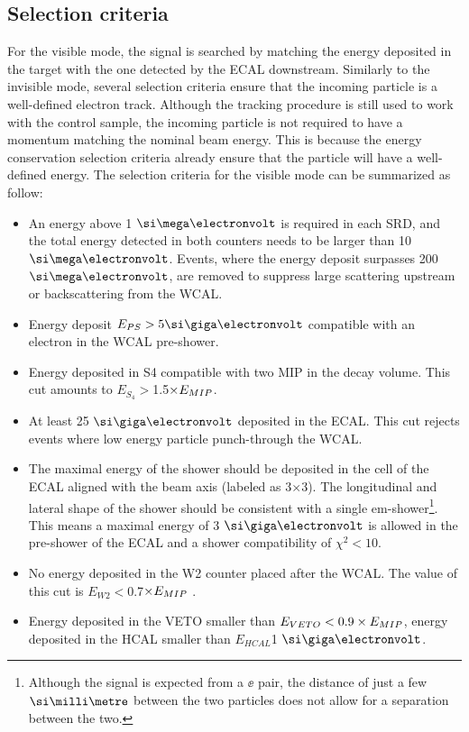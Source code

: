 \subsection{Selection criteria}
\label{ch3:sec:selection-criteria-vis}

For the visible mode, the signal is searched by matching the energy deposited in the target with the one detected by the ECAL downstream. Similarly to the invisible mode, several selection criteria ensure that the incoming particle is a well-defined electron track. Although the tracking procedure is still used to work with the control sample, the incoming particle is not required to have a momentum matching the nominal beam energy. This is because the energy conservation selection criteria already ensure that the particle will have a well-defined energy. The selection criteria for the visible mode can be summarized as follow:

\begin{itemize}
\item An energy above 1 $\mev$ is required in each SRD, and the total energy detected in both counters needs to be larger than 10 $\mev$. Events, where the energy deposit surpasses 200 $\mev$, are removed to suppress large scattering upstream or backscattering from the WCAL.
\item Energy deposit $E_{PS} > 5 \gev$ compatible with an electron in the WCAL pre-shower.
\item Energy deposited in S4 compatible with two MIP in the decay volume. This cut amounts to $E_{S_4} > $1.5$\times E_{MIP}$.
\item At least 25 $\gev$ deposited in the ECAL. This cut rejects events where low energy particle punch-through the WCAL.
\item The maximal energy of the shower should be deposited in the cell of the ECAL aligned with the beam axis (labeled as 3$\times$3). The longitudinal and lateral shape of the shower should be consistent with a single em-shower\footnote{Although the signal is expected from a $\ee$ pair, the distance of just a few $\mmi$ between the two particles does not allow for a separation between the two.}. This means a maximal energy of 3 $\gev$ is allowed in the pre-shower of the ECAL and a shower compatibility of $\chi^2 < 10$.
\item  No energy deposited in the W2 counter placed after the WCAL. The value of this cut is $E_{W2} < $0.7$\times E_{MIP}$ \cite{Banerjee:2019hmi}.  
\item Energy deposited in the VETO smaller than $E_{VETO} < 0.9\times E_{MIP}$, energy deposited in the HCAL smaller than $E_{HCAL}$1 $\gev$.  
\end{itemize}


